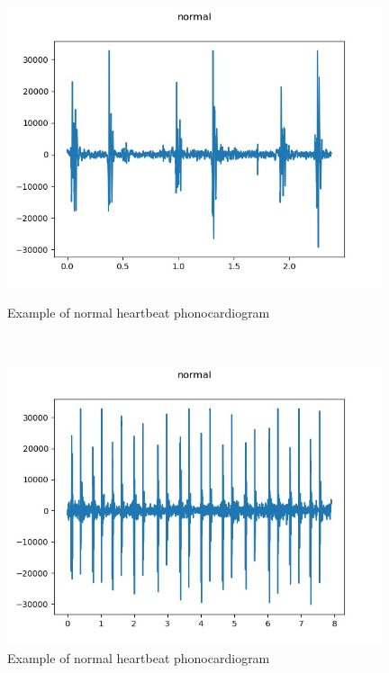 \documentclass[11pt, a4papper]{report}
\theoremstyle{plain}
\theoremstyle{definition}
\theoremstyle{definition}
\theoremstyle{proposition}
\begin{document}
\begin{figure}[H]
\includegraphics[width=11cm]{img/beforenorm/normal__106_1306776721273_C2.jpg}
\centering
\caption{Example of normal heartbeat phonocardiogram}
\

\includegraphics[width=11cm]{img/beforenorm/normal__128_1306344005749_B.jpg}
\centering
\caption{Example of normal heartbeat phonocardiogram}
\end{figure}
\
\end{document}
